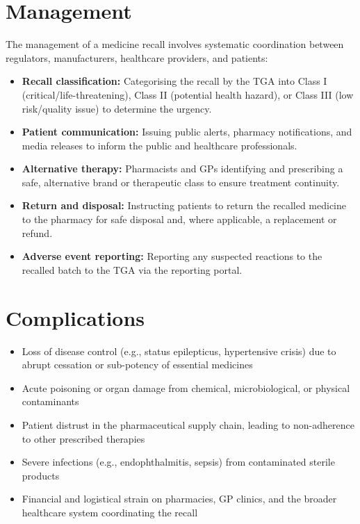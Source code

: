 \section*{Management}
The management of a medicine recall involves systematic coordination between regulators, manufacturers, healthcare providers, and patients:

\begin{itemize}
    \item \textbf{Recall classification:} Categorising the recall by the TGA into Class I (critical/life-threatening), Class II (potential health hazard), or Class III (low risk/quality issue) to determine the urgency.
    \item \textbf{Patient communication:} Issuing public alerts, pharmacy notifications, and media releases to inform the public and healthcare professionals.
    \item \textbf{Alternative therapy:} Pharmacists and GPs identifying and prescribing a safe, alternative brand or therapeutic class to ensure treatment continuity.
    \item \textbf{Return and disposal:} Instructing patients to return the recalled medicine to the pharmacy for safe disposal and, where applicable, a replacement or refund.
    \item \textbf{Adverse event reporting:} Reporting any suspected reactions to the recalled batch to the TGA via the reporting portal.
\end{itemize}

\section*{Complications}
\begin{itemize}
    \item Loss of disease control (e.g., status epilepticus, hypertensive crisis) due to abrupt cessation or sub-potency of essential medicines
    \item Acute poisoning or organ damage from chemical, microbiological, or physical contaminants
    \item Patient distrust in the pharmaceutical supply chain, leading to non-adherence to other prescribed therapies
    \item Severe infections (e.g., endophthalmitis, sepsis) from contaminated sterile products
    \item Financial and logistical strain on pharmacies, GP clinics, and the broader healthcare system coordinating the recall
\end{itemize}

